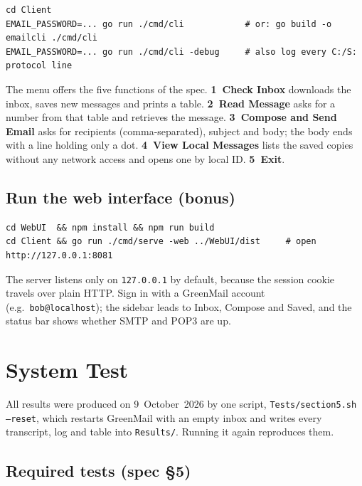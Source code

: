 \documentclass[11pt,a4paper]{article}
\begin{document}
\begin{lstlisting}[style=wire]
cd Client
EMAIL_PASSWORD=... go run ./cmd/cli            # or: go build -o emailcli ./cmd/cli
EMAIL_PASSWORD=... go run ./cmd/cli -debug     # also log every C:/S: protocol line
\end{lstlisting}

The menu offers the five functions of the spec. \textbf{1~Check Inbox} downloads the inbox,
saves new messages and prints a table. \textbf{2~Read Message} asks for a number from that
table and retrieves the message. \textbf{3~Compose and Send Email} asks for recipients
(comma-separated), subject and body; the body ends with a line holding only a dot.
\textbf{4~View Local Messages} lists the saved copies without any network access and opens
one by local ID. \textbf{5~Exit}.

\subsection{Run the web interface (bonus)}

\begin{lstlisting}[style=wire]
cd WebUI  && npm install && npm run build
cd Client && go run ./cmd/serve -web ../WebUI/dist     # open http://127.0.0.1:8081
\end{lstlisting}

The server listens only on \texttt{127.0.0.1} by default, because the session cookie travels
over plain HTTP. Sign in with a GreenMail account (e.g.\ \texttt{bob@localhost}); the sidebar
leads to Inbox, Compose and Saved, and the status bar shows whether SMTP and POP3 are up.

\section{System Test}

All results were produced on 9~October~2026 by one script, \texttt{Tests/section5.sh
--reset}, which restarts GreenMail with an empty inbox and writes every transcript, log and
table into \texttt{Results/}. Running it again reproduces them.

\subsection{Required tests (spec §5)}
\end{document}
